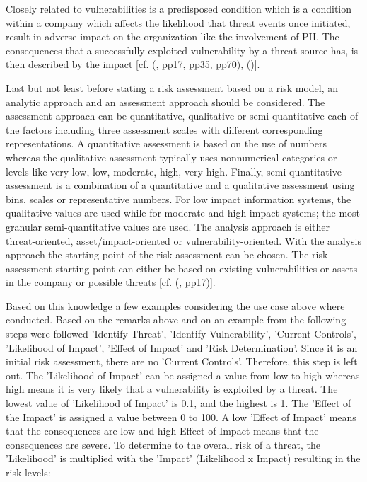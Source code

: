 Closely related to vulnerabilities is a predisposed condition which is a condition within a company which affects the likelihood that threat events once initiated, result in adverse impact on the organization like the involvement of PII. The consequences that a successfully exploited vulnerability by a threat source has, is then described by the impact  [cf. (\cite{NIST:2012:GCRA}, pp17, pp35, pp70), (\cite{NIST:2017:SecurityNPrivacyControls})].

Last but not least before stating a risk assessment based on a risk model, an analytic approach and an assessment approach should be considered. The assessment approach can be quantitative, qualitative or semi-quantitative each of the factors including three assessment scales with different corresponding representations. A quantitative assessment is based on the use of numbers whereas the qualitative assessment typically uses nonnumerical categories or levels like very low, low, moderate, high, very high. Finally, semi-quantitative assessment is a combination of a quantitative and a qualitative assessment using bins, scales or representative numbers. For low impact information systems, the qualitative values are used while for moderate-and high-impact systems; the most granular semi-quantitative values are used. The analysis approach is either threat-oriented, asset/impact-oriented or vulnerability-oriented. With the analysis approach the starting point of the risk assessment can be chosen. The risk assessment starting point can either be based on existing vulnerabilities or assets in the company or possible threats  [cf. (\cite{NIST:2012:GCRA}, pp17)].

Based on this knowledge a few examples considering the use case above where conducted. Based on the remarks above and on an example from \cite{Hudson:2015:SecurityRisk}  the following steps were followed  'Identify Threat', 'Identify Vulnerability', 'Current Controls', 'Likelihood of Impact', 'Effect of Impact' and 'Risk Determination'. Since it is an initial risk assessment, there are no 'Current Controls'. Therefore, this step is left out. The 'Likelihood of Impact' can be assigned a value from low to high whereas high means it is very likely that a vulnerability is exploited by a threat. The lowest value of 'Likelihood of Impact' is 0.1, and the highest is 1. The 'Effect of the Impact' is assigned a value between 0 to 100. A low 'Effect of Impact' means that the consequences are low and high Effect of Impact means that the consequences are severe. To determine to the overall risk of a threat, the 'Likelihood' is multiplied with the 'Impact' (Likelihood x Impact) resulting in the risk levels:

